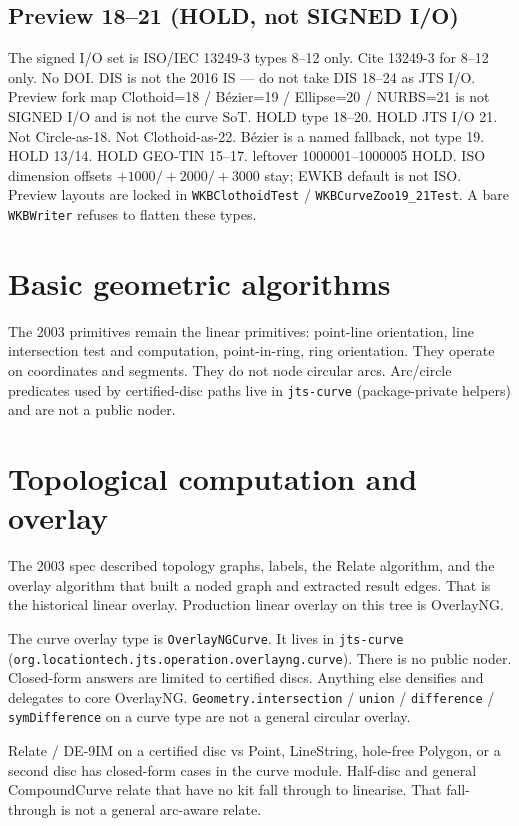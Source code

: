 \documentclass[11pt]{article}
\begin{document}
\subsection{Preview 18--21 (HOLD, not SIGNED I/O)}
The signed I/O set is ISO/IEC 13249-3 types 8--12 only. Cite
13249-3 for 8--12 only. No DOI. DIS is not the 2016 IS --- do not
take DIS 18--24 as JTS I/O. Preview fork map Clothoid=18 /
B\'ezier=19 / Ellipse=20 / NURBS=21 is not SIGNED I/O and is not
the curve SoT. HOLD type 18--20. HOLD JTS I/O 21. Not Circle-as-18.
Not Clothoid-as-22. B\'ezier is a named fallback, not type 19.
HOLD 13/14. HOLD GEO-TIN 15--17. leftover 1000001--1000005 HOLD.
ISO dimension offsets $+1000/+2000/+3000$ stay; EWKB default is
not ISO. Preview layouts are locked in \texttt{WKBClothoidTest} /
\texttt{WKBCurveZoo19\_21Test}. A bare \texttt{WKBWriter} refuses
to flatten these types.

\section{Basic geometric algorithms}
The 2003 primitives remain the linear primitives: point-line
orientation, line intersection test and computation, point-in-ring,
ring orientation. They operate on coordinates and segments. They do
not node circular arcs. Arc/circle predicates used by certified-disc
paths live in \texttt{jts-curve} (package-private helpers) and are
not a public noder.

\section{Topological computation and overlay}
The 2003 spec described topology graphs, labels, the Relate
algorithm, and the overlay algorithm that built a noded graph and
extracted result edges. That is the historical linear overlay.
Production linear overlay on this tree is OverlayNG.

The curve overlay type is \texttt{OverlayNGCurve}. It lives in
\texttt{jts-curve}
(\texttt{org.locationtech.jts.operation.overlayng.curve}). There is
no public noder. Closed-form answers are limited to certified discs.
Anything else densifies and delegates to core OverlayNG.
\texttt{Geometry.intersection} / \texttt{union} / \texttt{difference}
/ \texttt{symDifference} on a curve type are not a general circular
overlay.

Relate / DE-9IM on a certified disc vs Point, LineString, hole-free
Polygon, or a second disc has closed-form cases in the curve module.
Half-disc and general CompoundCurve relate that have no kit fall
through to linearise. That fall-through is not a general arc-aware
relate.
\end{document}
